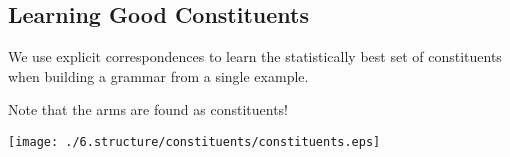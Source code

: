 

\subsection{Learning Good Constituents}

We use explicit correspondences to learn the statistically best set of
constituents when building a grammar from a single example.

Note that the arms are found as constituents!


\texttt{[image: ./6.structure/constituents/constituents.eps]}

